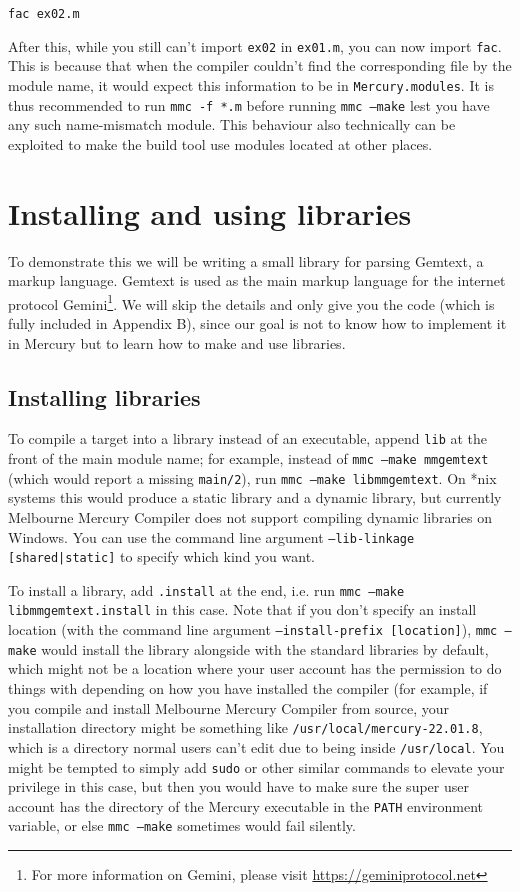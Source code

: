 \begin{lstlisting}
fac	ex02.m
\end{lstlisting}

After this, while you still can't import \texttt{ex02} in \texttt{ex01.m}, you can now import \texttt{fac}. This is because that when the compiler couldn't find the corresponding file by the module name, it would expect this information to be in \texttt{Mercury.modules}. It is thus recommended to run \texttt{mmc -f *.m} before running \texttt{mmc --make} lest you have any such name-mismatch module. This behaviour also technically can be exploited to make the build tool use modules located at other places.


\section{Installing and using libraries}

To demonstrate this we will be writing a small library for parsing Gemtext, a markup language. Gemtext is used as the main markup language for the internet protocol Gemini\footnote{For more information on Gemini, please visit \url{https://geminiprotocol.net}}. We will skip the details and only give you the code (which is fully included in Appendix B), since our goal is not to know how to implement it in Mercury but to learn how to make and use libraries.

\subsection{Installing libraries}

To compile a target into a library instead of an executable, append \texttt{lib} at the front of the main module name; for example, instead of \texttt{mmc --make mmgemtext} (which would report a missing \texttt{main/2}), run \texttt{mmc --make libmmgemtext}. On *nix systems this would produce a static library and a dynamic library, but currently Melbourne Mercury Compiler does not support compiling dynamic libraries on Windows. You can use the command line argument \texttt{--lib-linkage [shared|static]} to specify which kind you want.

To install a library, add \texttt{.install} at the end, i.e. run \texttt{mmc --make libmmgemtext.install} in this case. Note that if you don't specify an install location (with the command line argument \texttt{--install-prefix [location]}), \texttt{mmc --make} would install the library alongside with the standard libraries by default, which might not be a location where your user account has the permission to do things with depending on how you have installed the compiler (for example, if you compile and install Melbourne Mercury Compiler from source, your installation directory might be something like \texttt{/usr/local/mercury-22.01.8}, which is a directory normal users can't edit due to being inside \texttt{/usr/local}. You might be tempted to simply add \texttt{sudo} or other similar commands to elevate your privilege in this case, but then you would have to make sure the super user account has the directory of the Mercury executable in the \texttt{PATH} environment variable, or else \texttt{mmc --make} sometimes would fail silently.

